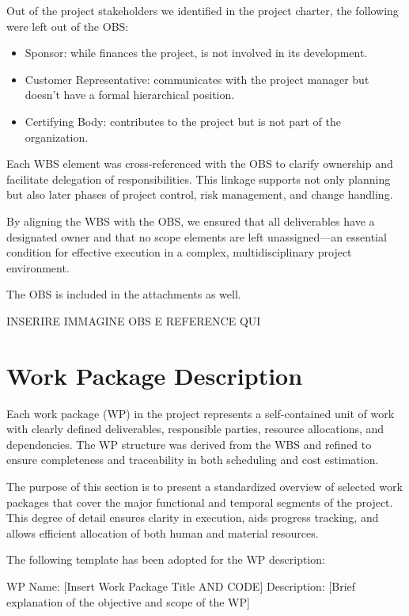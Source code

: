\documentclass[12pt]{article}
\begin{document}
Out of the project stakeholders we identified in the project charter, the following were left out of the OBS:
\begin{itemize}
        \item Sponsor: while finances the project, is not involved in its development.
        \item Customer Representative: communicates with the project manager but doesn't have a formal hierarchical position.
        \item Certifying Body: contributes to the project but is not part of the organization.
\end{itemize}

Each WBS element was cross-referenced with the OBS to clarify ownership and facilitate delegation of responsibilities. This linkage supports not only planning but also later phases of project control, risk management, and change handling.

By aligning the WBS with the OBS, we ensured that all deliverables have a designated owner and that no scope elements are left unassigned—an essential condition for effective execution in a complex, multidisciplinary project environment.

The OBS is included in the attachments as well.

INSERIRE IMMAGINE OBS E REFERENCE QUI

\section{Work Package Description}

Each work package (WP) in the project represents a self-contained unit of work with clearly defined deliverables, responsible parties, resource allocations, and dependencies. The WP structure was derived from the WBS and refined to ensure completeness and traceability in both scheduling and cost estimation.

The purpose of this section is to present a standardized overview of selected work packages that cover the major functional and temporal segments of the project. This degree of detail ensures clarity in execution, aids progress tracking, and allows efficient allocation of both human and material resources.

The following template has been adopted for the WP description:

WP Name: [Insert Work Package Title AND CODE]
Description:
[Brief explanation of the objective and scope of the WP]
\end{document}
